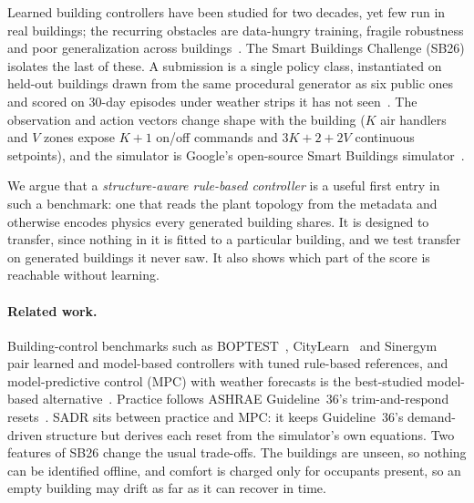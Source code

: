 \documentclass{article}
\begin{document}
Learned building controllers have been studied for two decades, yet few run in real buildings; the recurring obstacles are data-hungry training, fragile robustness and poor generalization across buildings~\citep{wang2020rl}. The Smart Buildings Challenge (SB26) isolates the last of these. A submission is a single policy class, instantiated on held-out buildings drawn from the same procedural generator as six public ones and scored on 30-day episodes under weather strips it has not seen~\citep{sb26kit}. The observation and action vectors change shape with the building ($K$ air handlers and $V$ zones expose $K{+}1$ on/off commands and $3K{+}2{+}2V$ continuous setpoints), and the simulator is Google's open-source Smart Buildings simulator~\citep{goldfeder2023lightweight,goldfeder2025suite}.

We argue that a \emph{structure-aware rule-based controller} is a useful first entry in such a benchmark: one that reads the plant topology from the metadata and otherwise encodes physics every generated building shares. It is designed to transfer, since nothing in it is fitted to a particular building, and we test transfer on generated buildings it never saw. It also shows which part of the score is reachable without learning.

\paragraph{Related work.} Building-control benchmarks such as BOPTEST~\citep{blum2021boptest}, CityLearn~\citep{vazquezcanteli2019citylearn} and Sinergym~\citep{jimenezraboso2021sinergym} pair learned and model-based controllers with tuned rule-based references, and model-predictive control (MPC) with weather forecasts is the best-studied model-based alternative~\citep{oldewurtel2012mpc,drgona2020mpc}. Practice follows ASHRAE Guideline~36's trim-and-respond resets~\citep{ashrae2021g36,taylor2018vav}. SADR sits between practice and MPC: it keeps Guideline~36's demand-driven structure but derives each reset from the simulator's own equations. Two features of SB26 change the usual trade-offs. The buildings are unseen, so nothing can be identified offline, and comfort is charged only for occupants present, so an empty building may drift as far as it can recover in time.
\end{document}
